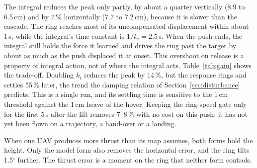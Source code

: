 The integral reduces the peak only partly, by about a quarter vertically (8.9 to 6.5\,cm) and by
7\,\% horizontally (7.7 to 7.2\,cm), because it is slower than the cascade. The ring reaches most
of its uncompensated displacement within about 1\,s, while the integral's time constant is
$1/k_i = 2.5$\,s. When the push ends, the integral still holds the force it learned and drives the
ring past the target by about as much as the push displaced it at onset. This overshoot on release
is a property of integral action, not of where the integral acts. Table~\ref{tab:gain} shows the
trade-off. Doubling $k_i$ reduces the peak by 14\,\%, but the response rings and settles 55\,\% later,
the trend the damping relation of Section~\ref{sec:disturbance} predicts. This is a single run, and its
settling time is sensitive to the 1\,cm threshold against the 1\,cm heave of the hover. Keeping the
ring-speed gate only for the first 5\,s after the lift removes 7--8\,\% with no cost on this push; it has
not yet been flown on a trajectory, a hand-over or a landing.

\begin{table}[h]
\centering
\caption{Integral gain and gate on the 0.6\,N vertical push, model integral. Peak: largest
displacement during the push; overshoot and settling (to within 1\,cm): after it ends. Brackets:
number of runs.}
\label{tab:gain}

\end{table}

When one UAV produces more thrust than its map assumes, both forms hold the height. Only the model
form also removes the horizontal error, and the ring tilts 1.5$^\circ$ further. The thrust error is a
moment on the ring that neither form controls.


